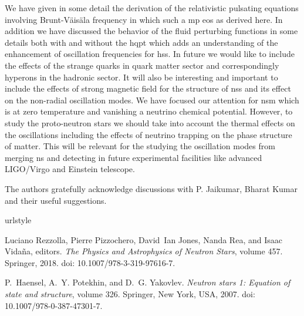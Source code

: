 \documentclass[a4paper, 11pt]{article}
\begin{document}
{We have given in some detail the derivation of the relativistic pulsating equations involving  Brunt-V\"ais\"ala frequency in which such a \ac{mp} \ac{eos} as derived here. In addition we have discussed the behavior of the fluid perturbing functions in some details both with and without the \ac{hqpt} which adds an understanding of the enhancement of oscillation frequencies for \ac{hs}s. In future we would like to include the effects of the strange quarks in quark matter sector and correspondingly hyperons in the hadronic sector. It will also be interesting and important to include the effects of strong magnetic field for the structure of \ac{ns}s \cite{Patra:2020} and its effect on the non-radial oscillation modes. We have focused our attention for \ac{nsm} which is at zero temperature and vanishing a neutrino chemical potential. However, to study the proto-neutron stars we should take into account the thermal effects on the oscillations including the effects of neutrino trapping on the phase structure of matter. This will be relevant for the studying the oscillation modes from merging \ac{ns} and detecting in future experimental facilities like advanced LIGO/Virgo and Einstein telescope.

\begin{acknowledgments}
The authors gratefully acknowledge discussions with P. Jaikumar, Bharat Kumar and their useful suggestions.
\end{acknowledgments}

%

\begin{thebibliography}{95}
\providecommand{\natexlab}[1]{#1}
\providecommand{\url}[1]{\texttt{#1}}
\expandafter\ifx\csname urlstyle\endcsname\relax
  \providecommand{\doi}[1]{doi: #1}\else
  \providecommand{\doi}{doi: \begingroup \urlstyle{rm}\Url}\fi

Luciano Rezzolla, Pierre Pizzochero, David~Ian Jones, Nanda Rea, and Isaac
  Vida\~na, editors.
\newblock \emph{{The Physics and Astrophysics of Neutron Stars}}, volume 457.
\newblock Springer, 2018.
\newblock \doi{10.1007/978-3-319-97616-7}.

P.~Haensel, A.~Y. Potekhin, and D.~G. Yakovlev.
\newblock \emph{{Neutron stars 1: Equation of state and structure}}, volume
  326.
\newblock Springer, New York, USA, 2007.
\newblock \doi{10.1007/978-0-387-47301-7}.


\end{thebibliography}}
\end{document}
